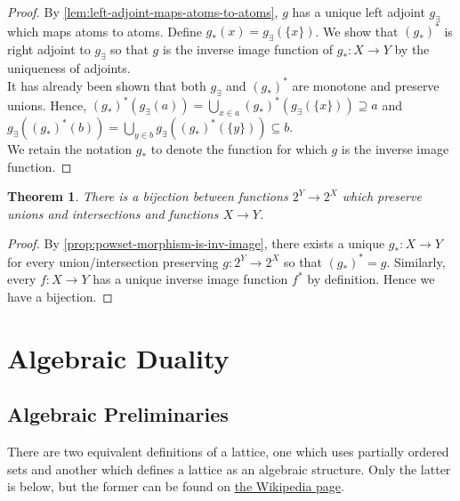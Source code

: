 \documentclass{article}
\newtheorem{theorem}[proposition]{Theorem}
\begin{document}
\begin{proof}
By \cref{lem:left-adjoint-maps-atoms-to-atoms}, $g$ has a unique left adjoint $g_\exists$ which maps atoms to atoms. Define $g_*(x) = g_\exists(\{x\})$. We show that $(g_*)^*$ is right adjoint to $g_\exists$ so that $g$ is the inverse image function of $g_* : X \to Y$ by the uniqueness of adjoints. \\

It has already been shown that both $g_\exists$ and $(g_*)^*$ are monotone and preserve unions. Hence, $(g_*)^*(g_\exists(a)) = \bigcup_{x \in a} (g_*)^*(g_\exists(\{x\})) \supseteq a$ and $g_\exists((g_*)^*(b)) = \bigcup_{y \in b} g_\exists((g_*)^*(\{y\})) \subseteq b$. \\

We retain the notation $g_*$ to denote the function for which $g$ is the inverse image function. 
\end{proof}

\begin{theorem} \label{thm:bijection-set-morphisms-to-powset-morphisms}
There is a bijection between functions $2^Y \to 2^X$ which preserve unions and intersections and functions $X \to Y$.
\end{theorem}

\begin{proof}
By \cref{prop:powset-morphism-is-inv-image}, there exists a unique $g_* : X \to Y$ for every union/intersection preserving $g : 2^Y \to 2^X$ so that $(g_*)^* = g$. Similarly, every $f : X \to Y$ has a unique inverse image function $f^*$ by definition. Hence we have a bijection.
\end{proof}

\pagebreak


\section{Algebraic Duality}

\subsection{Algebraic Preliminaries}

There are two equivalent definitions of a lattice, one which uses partially ordered sets and another which defines a lattice as an algebraic structure. Only the latter is below, but the former can be found on \href{https://en.wikipedia.org/wiki/Lattice_(order)}{the Wikipedia page}.
\end{document}
